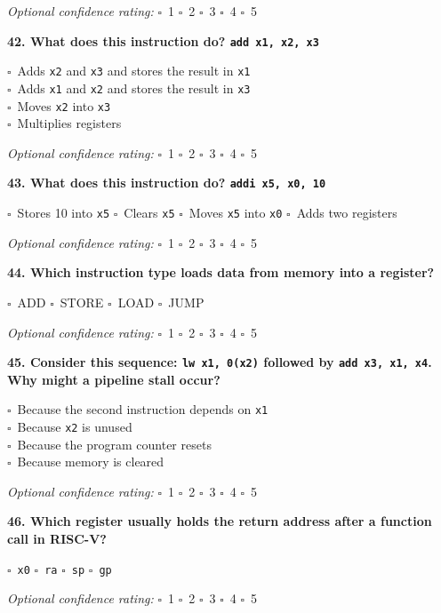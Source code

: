 \documentclass[12pt,a4paper]{article}
\newcommand{\boxmark}{\(\square\)}
\newcommand{\confidenceoptional}{%
    \textit{Optional confidence rating:} \boxmark\ 1 \hspace{1em} \boxmark\ 2 \hspace{1em} \boxmark\ 3 \hspace{1em} \boxmark\ 4 \hspace{1em} \boxmark\ 5
}
\begin{document}
\confidenceoptional

\textbf{42. What does this instruction do? \texttt{add x1, x2, x3}}

\boxmark\ Adds \texttt{x2} and \texttt{x3} and stores the result in \texttt{x1}\\
\boxmark\ Adds \texttt{x1} and \texttt{x2} and stores the result in \texttt{x3}\\
\boxmark\ Moves \texttt{x2} into \texttt{x3}\\
\boxmark\ Multiplies registers

\confidenceoptional

\textbf{43. What does this instruction do? \texttt{addi x5, x0, 10}}

\boxmark\ Stores 10 into \texttt{x5} \hspace{1em}
\boxmark\ Clears \texttt{x5} \hspace{1em}
\boxmark\ Moves \texttt{x5} into \texttt{x0} \hspace{1em}
\boxmark\ Adds two registers

\confidenceoptional

\textbf{44. Which instruction type loads data from memory into a register?}

\boxmark\ ADD \hspace{2em}
\boxmark\ STORE \hspace{2em}
\boxmark\ LOAD \hspace{2em}
\boxmark\ JUMP

\confidenceoptional

\textbf{45. Consider this sequence: \texttt{lw x1, 0(x2)} followed by \texttt{add x3, x1, x4}. Why might a pipeline stall occur?}

\boxmark\ Because the second instruction depends on \texttt{x1}\\
\boxmark\ Because \texttt{x2} is unused\\
\boxmark\ Because the program counter resets\\
\boxmark\ Because memory is cleared

\confidenceoptional

\textbf{46. Which register usually holds the return address after a function call in RISC-V?}

\boxmark\ \texttt{x0} \hspace{2em}
\boxmark\ \texttt{ra} \hspace{2em}
\boxmark\ \texttt{sp} \hspace{2em}
\boxmark\ \texttt{gp}

\confidenceoptional
\end{document}
